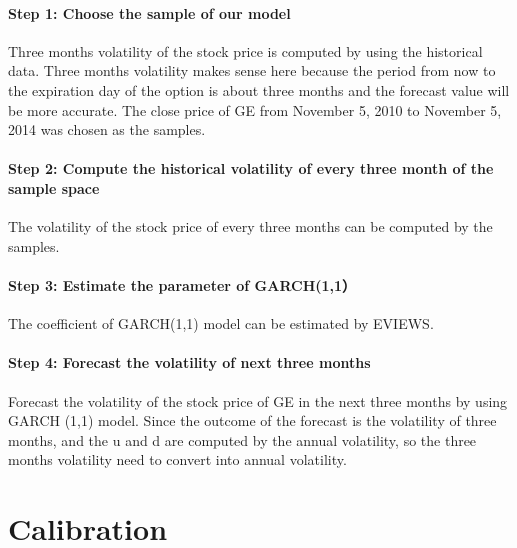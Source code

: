 \paragraph{Step 1: Choose the sample of our model}
Three months volatility of the stock price is computed by using the historical data. Three months volatility makes sense here because the period from now to the expiration day of the option is about three months and the forecast value will be more accurate. The close price of GE from November 5, 2010 to November 5, 2014 was chosen as the samples.
\paragraph{Step 2: Compute the historical volatility of every three month of the sample space}
The volatility of the stock price of every three months can be computed by the samples. 
\paragraph{Step 3: Estimate the parameter of GARCH(1,1）}
The coefficient of GARCH(1,1) model can be estimated by EVIEWS.
\paragraph{Step 4: Forecast the volatility of next three months}
Forecast the volatility of the stock price of GE in the next three months by using GARCH (1,1) model. Since the outcome of the forecast is the volatility of three months, and the u and d are computed by the annual volatility, so the three months volatility need to convert into annual volatility.
\section{Calibration}

